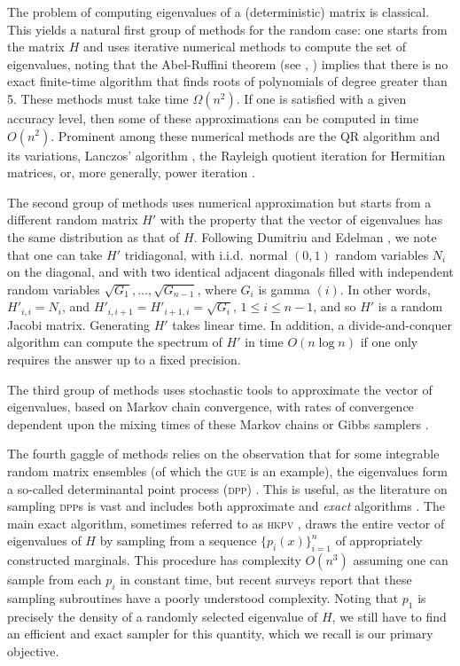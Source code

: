 \documentclass[10pt]{article}
\theoremstyle{definition}
\theoremstyle{remark}
\newcommand{\1}{\mathbbm{1}}
\newcommand{\0}{\mathbbm{0}}
\begin{document}
The problem of computing eigenvalues of a (deterministic) matrix is classical. This yields a natural first group of methods for the random case: one starts from the matrix $H$ and uses iterative numerical methods to compute the set of eigenvalues, noting that 
the Abel-Ruffini theorem (see \cite{abel}, \cite{ruffini}) implies that there is no exact finite-time algorithm that finds roots of polynomials of degree greater than 5.
These methods must take time $\Omega (n^2)$.
If one is satisfied with a given accuracy level, then some of these approximations can be computed in time $O(n^2)$.
Prominent among these numerical methods are the QR algorithm \cite{qr, qr2, qr3, watkins} and its variations, Lanczos' algorithm \cite{lanczos}, the Rayleigh quotient iteration \cite{kress} for Hermitian matrices, or, more generally, power iteration \cite{powerit}. 

The second group of methods uses numerical approximation but starts from a different random matrix $H'$ with the property that the vector of eigenvalues has the same distribution as that of $H$. Following Dumitriu and Edelman \cite{dumitriu+edelman}, we note that one can take $H'$ tridiagonal, with i.i.d.\ normal $(0,1)$ random variables $N_i$ on the diagonal, and with two identical adjacent diagonals filled with independent random variables  $\sqrt{G_1},\ldots, \sqrt{G_{n-1}}$, where $G_i$ is gamma $(i)$. In other words, $H'_{i,i} = N_i$, and $H'_{i,i+1}=H'_{i+1,i}=\sqrt{G_i}$, $1 \le i \le n-1$, and so $H'$ is a random Jacobi matrix.  Generating $H'$ takes linear time. In addition, a divide-and-conquer algorithm \cite{coakley} can compute the spectrum of $H'$ in time $O(n \log n)$ if one only requires the answer up to a fixed precision.

The third group of methods uses stochastic tools to approximate the vector of eigenvalues, based on Markov chain convergence, with rates of convergence dependent upon the mixing times of these Markov chains or Gibbs samplers \cite{krishna, gautier2021}. 

The fourth gaggle of methods relies on the observation that for some integrable random matrix ensembles (of which the \textsc{gue} is an example), the eigenvalues form a so-called determinantal point process (\textsc{dpp}) \cite{Macchi}. This is useful, as the literature on sampling \textsc{dpp}s is vast and includes both approximate \cite{KuleszaTaskar, affandi, LiSraJegelka} and \textit{exact} algorithms \cite{peres, launay2020exact}. 
The main exact algorithm, sometimes referred to as \textsc{hkpv} \cite{peres}, draws the entire vector of eigenvalues of $H$ by sampling from a sequence $\{p_i(x)\}_{i=1}^n$ of appropriately constructed marginals. This procedure has complexity $O(n^3)$ assuming one can sample from each $p_i$ in constant time, but recent surveys \cite{lavancier-, gautier2021, lille} report that these sampling subroutines have a poorly understood complexity. Noting that $p_1$ is precisely the density of a randomly selected eigenvalue of $H$, we still have to find an efficient and exact sampler for this quantity, which we recall is our primary objective.
\end{document}
